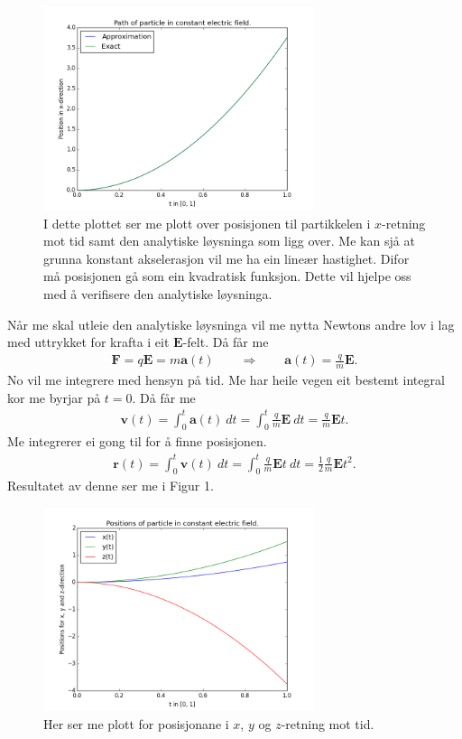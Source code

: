 \documentclass[11pt, a4paper]{article}
\begin{document}
  \begin{figure}[H]
    \centering
    \includegraphics[width=300px]{A.png}
    \caption{I dette plottet ser me plott over posisjonen til partikkelen i $x$-retning mot 
    tid samt den analytiske løysninga som ligg over.
    Me kan sjå at grunna konstant akselerasjon vil me ha ein lineær hastighet. Difor må 
    posisjonen gå som ein kvadratisk funksjon. Dette vil hjelpe oss med å verifisere den 
    analytiske løysninga.}
  \end{figure}
  Når me skal utleie den analytiske løysninga vil me nytta Newtons andre lov i lag med uttrykket for krafta i eit $\mathbf{E}$-felt. Då får me
  \begin{align*}
    \mathbf{F} = q\mathbf{E} = m\mathbf{a}(t) \qquad \Rightarrow \qquad \mathbf{a}(t) = \frac{q}{m}\mathbf{E}.
  \end{align*}
  No vil me integrere med hensyn på tid. Me har heile vegen eit bestemt integral kor me byrjar på $t = 0$. Då får me
  \begin{align*}
    \mathbf{v}(t) = \int_0^t\mathbf{a}(t) \ dt = \int_0^t \frac{q}{m}\mathbf{E} \ dt = \frac{q}{m}\mathbf{E}t.
  \end{align*}
  Me integrerer ei gong til for å finne posisjonen.
  \begin{align*}
    \mathbf{r}(t) = \int_0^t\mathbf{v}(t) \ dt = \int_0^t \frac{q}{m}\mathbf{E}t \ dt = \frac{1}{2}\frac{q}{m}\mathbf{E}t^2.
  \end{align*}
  Resultatet av denne ser me i Figur 1.

  \begin{figure}[H]
    \centering
    \includegraphics[width=300px]{C1.png}
    \caption{Her ser me plott for posisjonane i $x$, $y$ og $z$-retning mot tid.}
  \end{figure}
\end{document}
